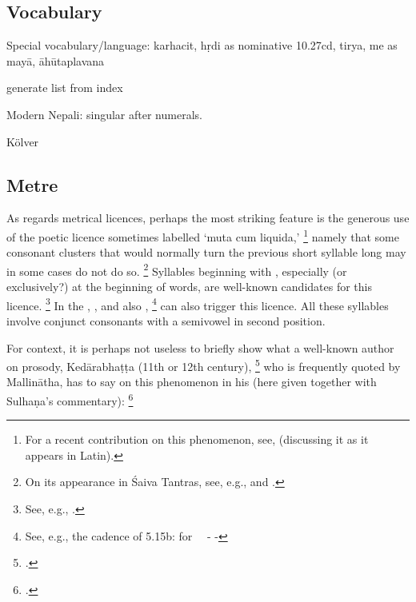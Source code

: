 \subsection{Vocabulary}




  Special vocabulary/language: karhacit, hṛdi as nominative 10.27cd,
  tirya, me as mayā, āhūtaplavana

  generate list from index

Modern Nepali: singular after numerals.

Kölver




\subsection{Metre}\label{metre}
\label{muta}
As regards metrical licences, perhaps 
the most striking feature is the generous
use of the poetic licence sometimes labelled `muta cum liquida,'%
	\footnote{For a recent contribution on this phenomenon, see,
 	  (discussing it as it appears in Latin).}
namely that some consonant clusters that would 
normally turn the previous short  syllable
long  may in some cases do not do so.%
		\footnote{On its appearance in Śaiva Tantras,
							see, e.g.,  and
							.}
Syllables beginning with , 
especially (or exclusively?) at the beginning of words, are well-known
candidates for this licence.%
			\footnote{See, e.g., .} 
In the \VSS, , and also 
,%
	\footnote{See, e.g., the cadence of 5.15b:  for \ \shortsyllable\ 
								\shortsyllable - \shortsyllable -}
can also trigger this licence. 
All these syllables involve conjunct consonants with
a semivowel in second position.

For context, it is perhaps not useless to briefly show
what a well-known author on prosody, 
Kedārabhaṭṭa (11th or 12th century),%
		\footnote{.}
who is frequently quoted by Mallinātha, has to say on this
phenomenon in his
 (here given together with Sulhaṇa's  commentary):%
		\footnote{\mycite{PatelVrttaratnakara}.}

